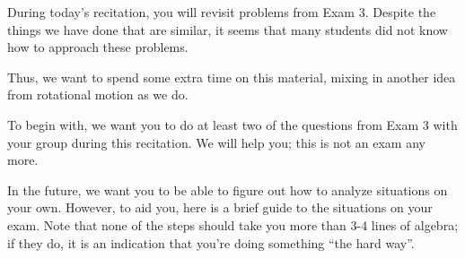 \documentclass[12pt]{article}
\begin{document}
\Large
\centerline{}
\normalsize
\centerline{}

During today's recitation, you will revisit problems from Exam 3. Despite the things we have done that are similar, it seems that many students did not know how to approach these problems.

Thus, we want to spend some extra time on this material, mixing in another idea from rotational motion as we do.

To begin with, we want you to do at least two of the questions from Exam 3 with your group during this recitation. We will help you; this is not an exam any more. 

In the future, we want you to be able to figure out how to analyze situations on your own. However, to aid you, here is a brief guide to the situations on your exam. Note that none of the steps should take you more than 3-4 lines of algebra; if they do, it is an indication that you're doing something ``the hard way''.
\end{document}
